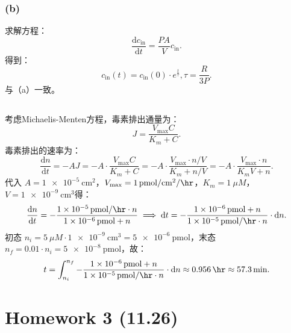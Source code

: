 \documentclass[10pt]{article}
\newcommand{\diff}{\mathrm{d}}
\begin{document}
\subsubsection*{(b)}
求解方程：
$$
\frac{\diff c_\text{in}}{\diff t} = \frac{PA}{V} c_\text{in}.
$$
得到：
$$
c_\text{in}(t) = c_\text{in}(0)\cdot e^{\frac{t}{\tau}}, \tau = \frac{R}{3P}.
$$
与（a）一致。

\subsection{}
考虑Michaelis-Menten方程，毒素排出通量为：
$$
J=\frac{V_\text{max}C}{K_m+C}.
$$
毒素排出的速率为：
$$
\frac{\diff n}{\diff t}= - A J = -A \cdot \frac{V_\text{max}C}{K_m+C} = -A \cdot \frac{V_\text{max}\cdot n/V}{K_m+n/V} = -A\cdot \frac{V_\text{max}\cdot n}{K_mV+n}.
$$
代入 $A = \qty{1e-5}{\cm \squared}$，$V_\text{max} = \qty{1}{\pmol \per \cm \squared \per \hr}$，$K_m = \qty{1}{\mu M}$，$V = \qty{1e-9}{\cm \cubed}$得：
$$
\frac{\diff n}{\diff t} = - \frac{\qty{1e-5}{\pmol \per \hr}\cdot n}{\qty{1e-6}{\pmol}+n} \implies \diff t = - \frac{\qty{1e-6}{\pmol}+n}{\qty{1e-5}{\pmol \per \hr}\cdot n} \cdot \diff n.
$$
初态 $n_i = \qty{5}{\mu M} \cdot \qty{1e-9}{\cm \cubed} = \qty{5e-6}{\pmol} $，末态 $n_f = 0.01 \cdot n_i  = \qty{5e-8}{\pmol}$，故：
$$
t= \int_{n_i}^{n_f} - \frac{\qty{1e-6}{\pmol}+n}{\qty{1e-5}{\pmol \per \hr}\cdot n} \cdot \diff n \approx \qty{0.956}{\hr} \approx \qty{57.3}{\min}.
$$


\newpage

\section{Homework 3 (11.26)}

\subsection{} %
\end{document}
